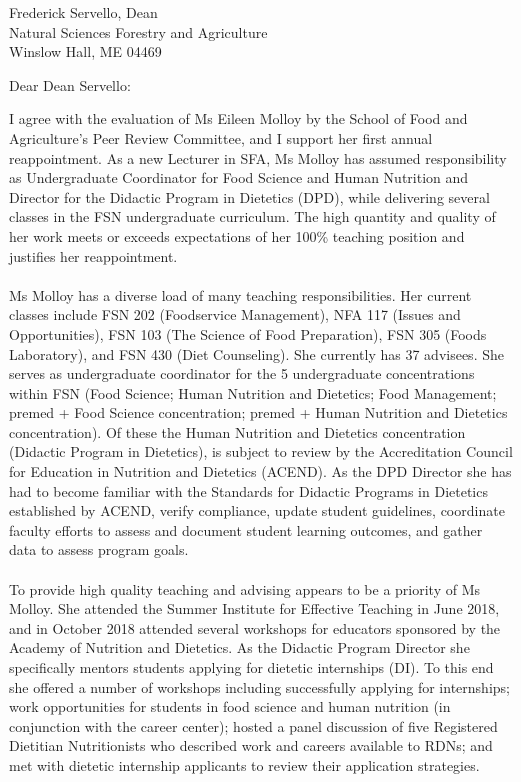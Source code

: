 \documentclass[a4paper,12pt]{letter}
\begin{document}
\begin{letter}{Frederick Servello, Dean\\Natural Sciences Forestry and Agriculture\\Winslow Hall, ME 04469}
\opening{Dear Dean Servello:} %
I agree with the evaluation of Ms Eileen Molloy by the School of Food and Agriculture's Peer Review Committee, and I support her first annual reappointment.  As a new Lecturer in SFA, Ms Molloy has assumed responsibility as Undergraduate Coordinator for Food Science and Human Nutrition and Director for the Didactic Program in Dietetics (DPD), while delivering several classes in the FSN undergraduate curriculum. The high quantity and quality of her work meets or exceeds expectations of her 100\% teaching position and justifies her reappointment. \\~\\
Ms Molloy has a diverse load of many teaching responsibilities. Her current classes include FSN 202 (Foodservice Management), NFA 117 (Issues and Opportunities), FSN 103 (The Science of Food Preparation), FSN 305 (Foods Laboratory), and FSN 430 (Diet Counseling). She currently has 37 advisees.  She serves as undergraduate coordinator for the 5 undergraduate concentrations within FSN (Food Science; Human Nutrition and Dietetics; Food Management; premed + Food Science concentration; premed + Human Nutrition and Dietetics concentration).  Of these the Human Nutrition and Dietetics concentration (Didactic Program in Dietetics), is subject to review by the Accreditation Council for Education in Nutrition and Dietetics (ACEND). As the DPD Director she has had to become familiar with the Standards for Didactic Programs in Dietetics established by ACEND, verify compliance, update student guidelines, coordinate faculty efforts to assess and document student learning outcomes, and gather data to assess program goals. \\~\\
To provide high quality teaching and advising appears to be a priority of Ms Molloy. She attended the Summer Institute for Effective Teaching in June 2018, and in October 2018 attended several workshops for educators sponsored by the Academy of Nutrition and Dietetics. As the Didactic Program Director she specifically mentors students applying for dietetic internships (DI). To this end she offered a number of workshops including successfully applying for internships; work opportunities for students in food science and human nutrition (in conjunction with the career center); hosted a panel discussion of five Registered Dietitian Nutritionists who described work and careers available to RDNs; and met with dietetic internship applicants to review their application strategies.\\~\\

\end{letter}
\end{document}
